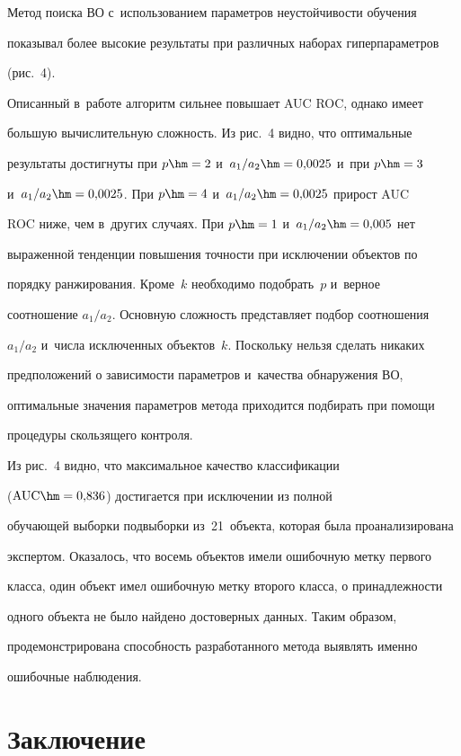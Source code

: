  Метод поиска ВО с~использованием параметров неустойчивости обучения 

показывал более высокие результаты при различных наборах гиперпараметров 

(рис.~4). 



  Описанный в~работе алгоритм сильнее повышает AUC ROC, однако имеет 

большую вычислительную сложность. Из рис.~4 видно, что оптимальные 

результаты достигнуты при $p\hm=2$ и~$a_1/a_2\hm=0{,}0025$ и~при $p\hm=3$

и~$a_1/a_2\hm=0{,}0025$. При $p\hm=4$ и~$a_1/a_2\hm=0{,}0025$ прирост AUC 

ROC ниже, чем в~других случаях. При $p\hm=1$ и~$a_1/a_2\hm=0{,}005$ нет 

выраженной тенденции повышения точности при исключении объектов по 

порядку ранжирования. Кроме~$k$ необходимо подобрать~$p$ и~верное 

соотношение $a_1/a_2$. Основную сложность представляет подбор соотношения 

$a_1/a_2$ и~числа исключенных объектов~$k$. Поскольку нельзя сделать никаких 

предположений о зависимости параметров и~качества обнаружения ВО, 

оптимальные значения параметров метода приходится подбирать при помощи 

процедуры скользящего контроля. 

  

  Из рис.~4 видно, что максимальное качество классификации 

($\mathrm{AUC}\hm=0{,}836$) достигается при исключении из полной 

обучающей выборки подвыборки из~21~объекта, которая была проанализирована 

экспертом. Оказалось, что восемь объектов имели ошибочную метку первого 

класса, один объект имел ошибочную метку второго класса, о принадлежности 

одного объекта не было найдено достоверных данных. Таким образом, 

продемонстрирована способность разработанного метода выявлять именно 

ошибочные наблюдения.

  

\section{Заключение}

